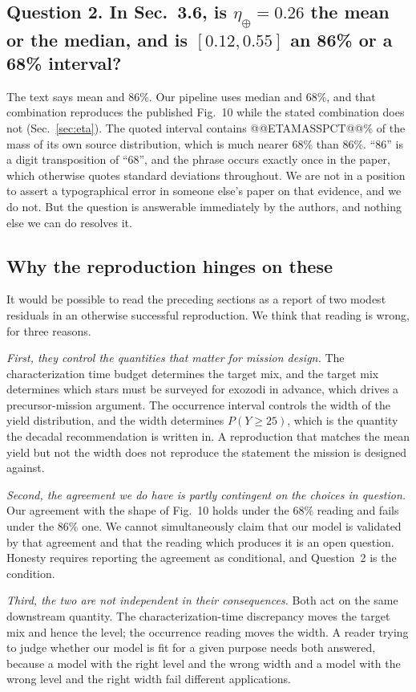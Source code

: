 \documentclass[11pt,a4paper]{article}
\begin{document}
\subsection*{Question 2. In Sec.~3.6, is $\eta_\oplus = 0.26$ the mean or the median, and is
$[0.12, 0.55]$ an 86\% or a 68\% interval?}

The text says mean and 86\%. Our pipeline uses median and 68\%, and that combination reproduces
the published Fig.~10 while the stated combination does not (Sec.~\ref{sec:eta}). The quoted
interval contains @@ETAMASSPCT@@\% of the mass of its own source distribution, which is much
nearer 68\% than 86\%. ``86'' is a digit transposition of ``68'', and the phrase occurs exactly
once in the paper, which otherwise quotes standard deviations throughout. We are not in a position
to assert a typographical error in someone else's paper on that evidence, and we do not. But the
question is answerable immediately by the authors, and nothing else we can do resolves it.

\subsection*{Why the reproduction hinges on these}

It would be possible to read the preceding sections as a report of two modest residuals in an
otherwise successful reproduction. We think that reading is wrong, for three reasons.

\emph{First, they control the quantities that matter for mission design.} The characterization
time budget determines the target mix, and the target mix determines which stars must be
surveyed for exozodi in advance, which drives a precursor-mission argument. The occurrence
interval controls the width of the yield distribution, and the width determines
$P(Y \ge 25)$, which is the quantity the decadal recommendation is written in. A reproduction
that matches the mean yield but not the width does not reproduce the statement the mission is
designed against.

\emph{Second, the agreement we do have is partly contingent on the choices in question.} Our
agreement with the shape of Fig.~10 holds under the 68\% reading and fails under the 86\%
one. We cannot simultaneously claim that our model is validated by that
agreement and that the reading which produces it is an open question. Honesty requires reporting
the agreement as conditional, and Question~2 is the condition.

\emph{Third, the two are not independent in their consequences.} Both act on the same downstream
quantity. The characterization-time discrepancy moves the target mix and hence the level; the
occurrence reading moves the width. A reader trying to judge whether our model is fit for a given
purpose needs both answered, because a model with the right level and the wrong width and a model
with the wrong level and the right width fail different applications.
\end{document}
